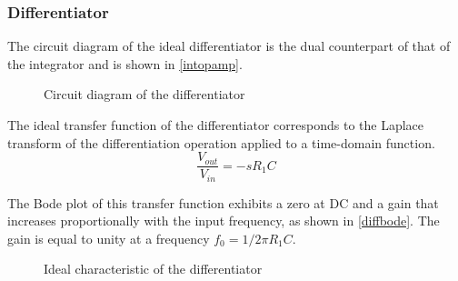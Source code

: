 \documentclass[../main.tex]{subfiles}
\begin{document}
\subsubsection{Differentiator}


The circuit diagram of the ideal differentiator is the dual counterpart of that of the integrator and is shown in \autoref{intopamp}.\\


\begin{figure}[h!]
\begin{center}


\label{intopamp}
\caption{Circuit diagram of the differentiator}	
\end{center}	
\end{figure}
 
The ideal transfer function of the differentiator corresponds to the Laplace transform of the differentiation operation applied to a time-domain function.\\

\begin{equation}
	\frac{V_{out}}{V_{in}} = -sR_1C
\end{equation}

The Bode plot of this transfer function exhibits a zero at DC and a gain that increases proportionally with the input frequency, as shown in \autoref{diffbode}. The gain is equal to unity at a frequency $f_0 = 1 / 2\pi R_1C$.\\


\begin{figure}[h!]
\begin{center}

\caption{Ideal characteristic of the differentiator}	
\label{diffbode}
\end{center}	
\end{figure}
\end{document}
